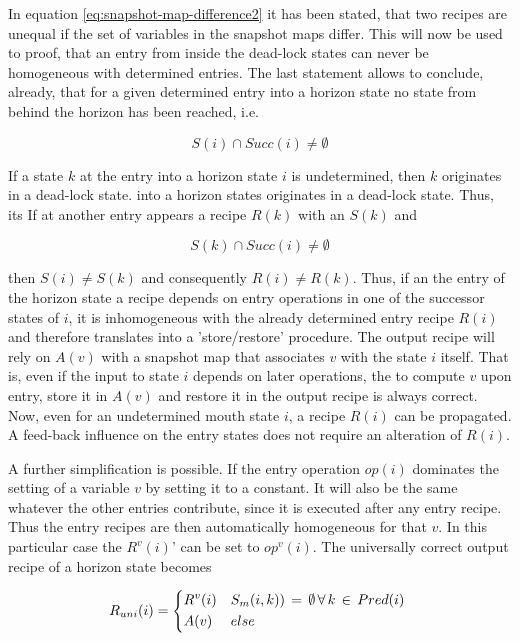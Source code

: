 \documentclass[12pt,a4paper]{scrartcl}
\begin{document}
In equation \eqref{eq:snapshot-map-difference2} it has been stated, that two
recipes are unequal if the set of variables in the snapshot maps differ.  This
will now be used to proof, that an entry from inside the dead-lock states can
never be homogeneous with determined entries.  The last statement allows to
conclude, already, that for a given determined entry into a horizon state no
state from behind the horizon has been reached, i.e.

\begin{equation}
    S(i) \cap Succ(i) \neq \emptyset
\end{equation}

If a state $k$ at the entry into a horizon state $i$ is undetermined, then
$k$ originates in a dead-lock state. into a horizon states originates in a dead-lock state. 
Thus, its If at another entry appears a recipe $R(k)$ with an $S(k)$ and 

\begin{equation}
              S(k) \cap Succ(i) \neq \emptyset
\end{equation}

then \(S(i) \neq S(k)\) and consequently \(R(i) \neq R(k)\). Thus, if an the entry of
the horizon state a recipe depends on entry operations in one of the successor
states of $i$, it is inhomogeneous with the already determined entry recipe
$R(i)$ and therefore translates into a 'store/restore' procedure. The output
recipe will rely on $A(v)$ with a snapshot map that associates $v$ with the
state $i$ itself. That is, even if the input to state $i$ depends on later
operations, the to compute $v$ upon entry, store it in $A(v)$ and restore it in
the output recipe is always correct. Now, even for an undetermined mouth state
$i$, a recipe $R(i)$ can be propagated.  A feed-back influence on the entry
states does not require an alteration of $R(i)$.

A further simplification is possible. If the entry operation $op(i)$ dominates
the setting of a variable $v$ by setting it to a constant.  It will also be the
same whatever the other entries contribute, since it is executed after any
entry recipe. Thus the entry recipes are then automatically homogeneous for
that $v$. In this particular case the $R^v(i)$' can be set to $op^v(i)$.  The
universally correct output recipe of a horizon state becomes 

\begin{equation}
    R_{uni}(i) = \begin{dcases*}
                 R^v(i) & $S_m(i,k))\,=\,\emptyset\,\forall\,k\,\in\,Pred(i)$ \\
                 A(v)   & $else$
                 \end{dcases*}
\end{equation}
\end{document}
